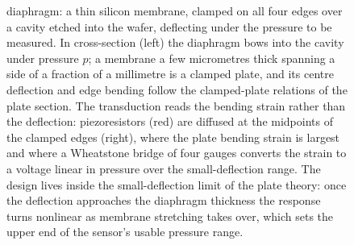 \begin{figure}[htbp]
{diaphragm: a thin silicon membrane, clamped on all four edges over a cavity
etched into the wafer, deflecting under the pressure to be measured. In
cross-section (left) the diaphragm bows into the cavity under pressure $p$; a
membrane a few micrometres thick spanning a side of a fraction of a
millimetre is a clamped plate, and its centre deflection and edge bending
follow the clamped-plate relations of the plate section. The transduction
reads the bending strain rather than the deflection: piezoresistors (red) are
diffused at the midpoints of the clamped edges (right), where the plate
bending strain is largest and where a Wheatstone bridge of four gauges
converts the strain to a voltage linear in pressure over the small-deflection
range. The design lives inside the small-deflection limit of the plate
theory: once the deflection approaches the diaphragm thickness the response
turns nonlinear as membrane stretching takes over, which sets the upper end
of the sensor's usable pressure range.}
\label{fig:vol03ch09:mems-diaphragm}
\end{figure}

